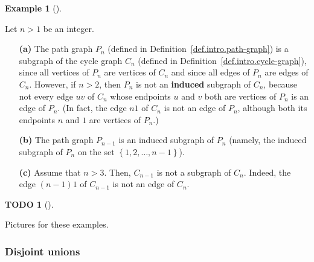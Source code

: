 \documentclass[numbers=enddot,12pt,final,onecolumn,notitlepage]{scrartcl}%
\theoremstyle{definition}
\newtheorem{exam}[theo]{Example}
\newenvironment{example}[1][]
{\begin{exam}[#1]\begin{leftbar}}
{\end{leftbar}\end{exam}}
\newtheorem{quest}[theo]{TODO}
\newenvironment{todo}[1][]
{\begin{quest}[#1]\begin{leftbar}}
{\end{leftbar}\end{quest}}
\newcommand{\set}[1]{\left\{ #1 \right\}}
\newcommand{\tup}[1]{\left( #1 \right)}
\begin{document}
\begin{example} \label{exa.intro.subgraph}
Let $n > 1$ be an integer.

\begin{enumerate}

\item[\textbf{(a)}] The path graph $P_n$ (defined in
Definition~\ref{def.intro.path-graph}) is a subgraph of the cycle
graph $C_n$ (defined in Definition~\ref{def.intro.cycle-graph}),
since all vertices of $P_n$ are vertices of $C_n$ and since all edges
of $P_n$ are edges of $C_n$. However, if $n > 2$, then
$P_n$ is not an \textbf{induced} subgraph of $C_n$,
because not every edge $uv$ of $C_n$ whose
endpoints $u$ and $v$ both are vertices of $P_n$ is an edge of $P_n$.
(In fact, the edge $n1$ of $C_n$ is not an edge of $P_n$, although
both its endpoints $n$ and $1$ are vertices of $P_n$.)

\item[\textbf{(b)}] The path graph $P_{n-1}$ is an induced subgraph
of $P_n$ (namely, the induced subgraph of $P_n$ on the set
$\set{1, 2, \ldots, n-1}$).

\item[\textbf{(c)}] Assume that $n > 3$. Then, $C_{n-1}$ is not a
subgraph of $C_n$. Indeed, the edge $\tup{n-1}1$ of $C_{n-1}$ is
not an edge of $C_n$.

\end{enumerate}

\end{example}

\begin{todo}
Pictures for these examples.
\end{todo}

\subsubsection{\label{subsect.intro.djun}Disjoint unions}
\end{document}
